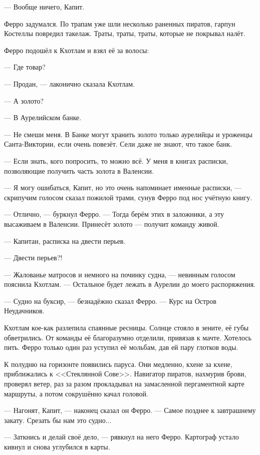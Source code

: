 --- Вообще ничего, Капит.

Ферро задумался.
По трапам уже шли несколько раненных пиратов, гарпун Костеллы повредил такелаж.
Траты, траты, траты, которые не покрывал налёт.

Ферро подошёл к Кхотлам и взял её за волосы:

--- Где товар?

--- Продан, --- лаконично сказала Кхотлам.

--- А золото?

--- В Аурелийском банке.

--- Не смеши меня.
В Банке могут хранить золото только аурелийцы и уроженцы Санта-Виктории, если очень повезёт.
Сели даже не знают, что такое банк.

--- Если знать, кого попросить, то можно всё.
У меня в книгах расписки, позволяющие получить часть золота в Валенсии.

--- Я могу ошибаться, Капит, но это очень напоминает именные расписки, --- скрипучим голосом сказал пожилой трами, сунув Ферро под нос учётную книгу.

--- Отлично, --- буркнул Ферро.
--- Тогда берём этих в заложники, а эту высаживаем в Валенсии.
Принесёт золото --- получит команду живой.

--- Капитан, расписка на двести перьев.

--- Двести перьев?!

--- Жалованье матросов и немного на починку судна, --- невинным голосом пояснила Кхотлам.
--- Остальное будет лежать в Аурелии до моего распоряжения.

--- Судно на буксир, --- безнадёжно сказал Ферро.
--- Курс на Остров Неудачников.

\asterism

Кхотлам кое-как разлепила спаянные ресницы.
Солнце стояло в зените, её губы обветрились.
От команды её благоразумно отделили, привязав к мачте.
Хотелось пить.
Ферро только один раз уступил её мольбам, дав ей пару глотков воды.

К полудню на горизонте появились паруса.
Они медленно, кхене за кхене, приближались к <<Стеклянной Сове>>.
Навигатор пиратов, нахмурив брови, проверял ветер, раз за разом прокладывал на замасленной пергаментной карте маршруты, а потом сокрушённо качал головой.

--- Нагонят, Капит, --- наконец сказал он Ферро.
--- Самое позднее к завтрашнему закату.
Срезать бы нам это судно...

--- Заткнись и делай своё дело, --- рявкнул на него Ферро.
Картограф устало кивнул и снова углубился в карты.

